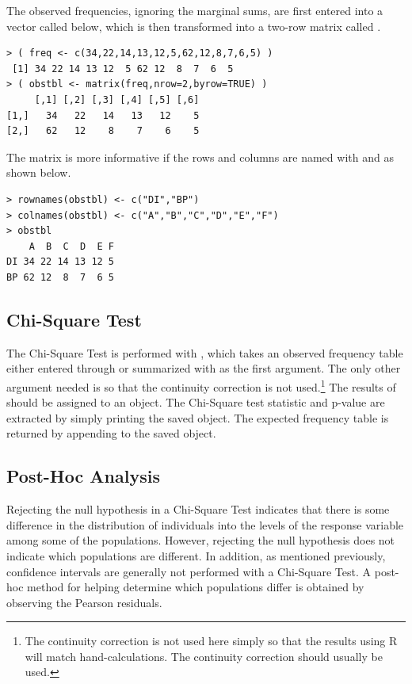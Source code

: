 \documentclass[10pt,openany]{book}\usepackage[]{graphicx}\usepackage[]{color}
\makeatletter
\newenvironment{kframe}{%
 \def\at@end@of@kframe{}%
 \ifinner\ifhmode%
  \def\at@end@of@kframe{\end{minipage}}%
  \begin{minipage}{\columnwidth}%
 \fi\fi%
 \def\FrameCommand##1{\hskip\@totalleftmargin \hskip-\fboxsep
 \colorbox{shadecolor}{##1}\hskip-\fboxsep
     \hskip-\linewidth \hskip-\@totalleftmargin \hskip\columnwidth}%
 \MakeFramed {\advance\hsize-\width
   \@totalleftmargin\z@ \linewidth\hsize
   \@setminipage}}%
 {\par\unskip\endMakeFramed%
 \at@end@of@kframe}
\newenvironment{knitrout}{}{} %
\makeatother
\begin{document}
The observed frequencies, ignoring the marginal sums, are first entered into a vector called  below, which is then transformed into a two-row matrix called .
\begin{knitrout}
\color{fgcolor}\begin{kframe}
\begin{verbatim}
> ( freq <- c(34,22,14,13,12,5,62,12,8,7,6,5) )
 [1] 34 22 14 13 12  5 62 12  8  7  6  5
> ( obstbl <- matrix(freq,nrow=2,byrow=TRUE) )
     [,1] [,2] [,3] [,4] [,5] [,6]
[1,]   34   22   14   13   12    5
[2,]   62   12    8    7    6    5
\end{verbatim}
\end{kframe}
\end{knitrout}

The matrix is more informative if the rows and columns are named with  and  as shown below.
\begin{knitrout}
\color{fgcolor}\begin{kframe}
\begin{verbatim}
> rownames(obstbl) <- c("DI","BP")
> colnames(obstbl) <- c("A","B","C","D","E","F")
> obstbl
    A  B  C  D  E F
DI 34 22 14 13 12 5
BP 62 12  8  7  6 5
\end{verbatim}
\end{kframe}
\end{knitrout}

\subsection{Chi-Square Test}
The Chi-Square Test is performed with , which takes an observed frequency table either entered through  or summarized with  as the first argument. The only other argument needed is  so that the continuity correction is not used.\footnote{The continuity correction is not used here simply so that the results using R will match hand-calculations. The continuity correction should usually be used.} The results of  should be assigned to an object. The Chi-Square test statistic and p-value are extracted by simply printing the saved object. The expected frequency table is returned by appending  to the saved object.

\subsection{Post-Hoc Analysis}
Rejecting the null hypothesis in a Chi-Square Test indicates that there is some difference in the distribution of individuals into the levels of the response variable among some of the populations. However, rejecting the null hypothesis does not indicate which populations are different. In addition, as mentioned previously, confidence intervals are generally not performed with a Chi-Square Test. A post-hoc method for helping determine which populations differ is obtained by observing the Pearson residuals.
\end{document}
